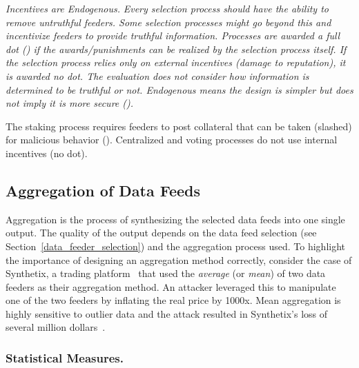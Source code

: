 \emph{Incentives are Endogenous.} \textit{Every selection process should have the ability to remove untruthful feeders. Some selection processes might go beyond this and incentivize feeders to provide truthful information. Processes are awarded a full dot (\full) if the awards/punishments can be realized by the selection process itself. If the selection process relies only on external incentives (\eg damage to reputation), it is awarded no dot. The evaluation does not consider how information is determined to be truthful or not. Endogenous means the design is simpler but does not imply it is more secure (\cf \cite{FoBo19}).}

The staking process requires feeders to post collateral that can be taken (\ie slashed) for malicious behavior (\full). Centralized and voting processes do not use internal incentives (no dot).


\subsection{Aggregation of Data Feeds}\label{aggregation} 

Aggregation is the process of synthesizing the selected data feeds into one single output. The quality of the output depends on the data feed selection (see Section~\ref{data_feeder_selection}) and the aggregation process used. To highlight the importance of designing an aggregation method correctly, consider the case of Synthetix, a trading platform~\cite{synthetix} that used the \textit{average} (or \textit{mean}) of two data feeders as their aggregation method. An attacker leveraged this to manipulate one of the two feeders by inflating the real price by 1000x. Mean aggregation is highly sensitive to outlier data and the attack resulted in Synthetix's loss of several million dollars~\cite{synthetixIncident}.

\subsubsection{Statistical Measures.}

